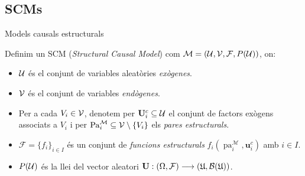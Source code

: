 \documentclass{bestbeamer}
\begin{document}
\subsection{SCMs}
\begin{frame}{Models causals estructurals}\label{frame:SCMs}
\begin{definition}\label{def:scm}
Definim un SCM (\emph{Structural Causal Model}) com $\mathcal{M} = (\mathcal{U},\mathcal{V},\mathcal{F},P(\mathcal{U}))$, on:
\begin{itemize}
    \item $\mathcal{U}$ és el conjunt de variables aleatòries \emph{exògenes}.
    \item $\mathcal{V}$ és el conjunt de variables \emph{endògenes}. 
    \item Per a cada $V_i\in\mathcal{V}$, denotem per $\mathbf{U}_i^c\subseteq\mathcal{U}$ el conjunt de factors exògens associats a $V_i$ i per $\operatorname{Pa}_i^{\mathcal{M}}\subseteq\mathcal{V}\setminus\{V_i\}$ els \textit{pares estructurals}.
    \item $\mathcal{F}=\{f_i\}_{i\in I}$ és un conjunt de \textit{funcions estructurals} $f_i(\operatorname{pa}_i^\mathcal{M},\mathbf{u}_i^c)$ amb $i\in I$.
    \item $P(\mathcal{U})$ és la llei del vector aleatori $\mathbf{U}:(\Omega,\mathcal F)\longrightarrow(\mathfrak U,\mathcal B(\mathfrak U))$.
\end{itemize}
\end{definition}
\vfill
\hfill{}
\end{frame}
\end{document}
